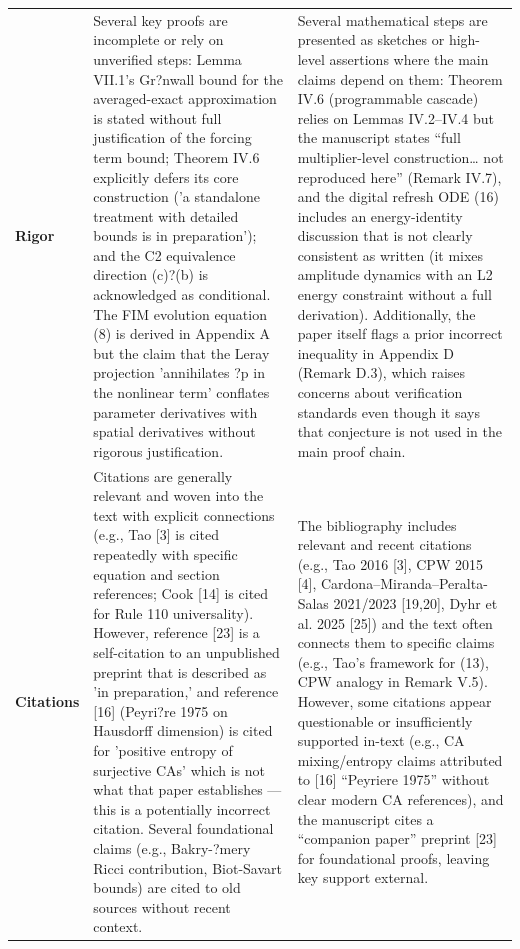 \documentclass[11pt]{article}
\begin{document}
\begin{longtable}{@{} p{2.2cm} p{6.3cm} p{6.3cm} @{}}
\rowcolor{rowgray}
\textbf{Rigor} &
Several key proofs are incomplete or rely on unverified steps: Lemma VII.1's Gr?nwall bound for the averaged-exact approximation is stated without full justification of the forcing term bound; Theorem IV.6 explicitly defers its core construction ('a standalone treatment with detailed bounds is in preparation'); and the C2 equivalence direction (c)?(b) is acknowledged as conditional. The FIM evolution equation (8) is derived in Appendix A but the claim that the Leray projection 'annihilates ?p in the nonlinear term' conflates parameter derivatives with spatial derivatives without rigorous justification. &
Several mathematical steps are presented as sketches or high-level assertions where the main claims depend on them: Theorem IV.6 (programmable cascade) relies on Lemmas IV.2--IV.4 but the manuscript states ``full multiplier-level construction\ldots{} not reproduced here'' (Remark IV.7), and the digital refresh ODE (16) includes an energy-identity discussion that is not clearly consistent as written (it mixes amplitude dynamics with an L2 energy constraint without a full derivation). Additionally, the paper itself flags a prior incorrect inequality in Appendix D (Remark D.3), which raises concerns about verification standards even though it says that conjecture is not used in the main proof chain. \\[6pt]

\textbf{Citations} &
Citations are generally relevant and woven into the text with explicit connections (e.g., Tao [3] is cited repeatedly with specific equation and section references; Cook [14] is cited for Rule 110 universality). However, reference [23] is a self-citation to an unpublished preprint that is described as 'in preparation,' and reference [16] (Peyri?re 1975 on Hausdorff dimension) is cited for 'positive entropy of surjective CAs' which is not what that paper establishes --- this is a potentially incorrect citation. Several foundational claims (e.g., Bakry-?mery Ricci contribution, Biot-Savart bounds) are cited to old sources without recent context. &
The bibliography includes relevant and recent citations (e.g., Tao 2016 [3], CPW 2015 [4], Cardona--Miranda--Peralta-Salas 2021/2023 [19,20], Dyhr et al. 2025 [25]) and the text often connects them to specific claims (e.g., Tao's framework for (13), CPW analogy in Remark V.5). However, some citations appear questionable or insufficiently supported in-text (e.g., CA mixing/entropy claims attributed to [16] ``Peyriere 1975'' without clear modern CA references), and the manuscript cites a ``companion paper'' preprint [23] for foundational proofs, leaving key support external. \\

\end{longtable}
\end{document}
